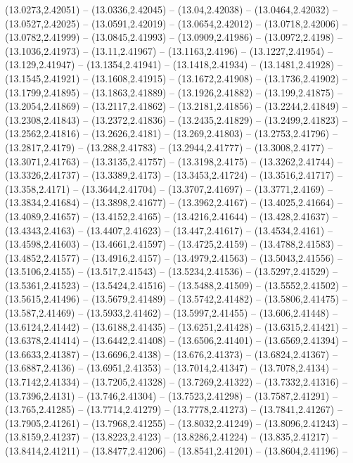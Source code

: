 {(13.0273,2.42051) -- (13.0336,2.42045) -- (13.04,2.42038) -- (13.0464,2.42032) -- (13.0527,2.42025) -- (13.0591,2.42019) -- (13.0654,2.42012) -- (13.0718,2.42006) -- (13.0782,2.41999) -- (13.0845,2.41993) -- (13.0909,2.41986) -- (13.0972,2.4198) --
(13.1036,2.41973) -- (13.11,2.41967) -- (13.1163,2.4196) -- (13.1227,2.41954) -- (13.129,2.41947) -- (13.1354,2.41941) -- (13.1418,2.41934) -- (13.1481,2.41928) -- (13.1545,2.41921) -- (13.1608,2.41915) -- (13.1672,2.41908) -- (13.1736,2.41902) --
(13.1799,2.41895) -- (13.1863,2.41889) -- (13.1926,2.41882) -- (13.199,2.41875) -- (13.2054,2.41869) -- (13.2117,2.41862) -- (13.2181,2.41856) -- (13.2244,2.41849) -- (13.2308,2.41843) -- (13.2372,2.41836) -- (13.2435,2.41829) -- (13.2499,2.41823)
-- (13.2562,2.41816) -- (13.2626,2.4181) -- (13.269,2.41803) -- (13.2753,2.41796) -- (13.2817,2.4179) -- (13.288,2.41783) -- (13.2944,2.41777) -- (13.3008,2.4177) -- (13.3071,2.41763) -- (13.3135,2.41757) -- (13.3198,2.4175) -- (13.3262,2.41744) --
(13.3326,2.41737) -- (13.3389,2.4173) -- (13.3453,2.41724) -- (13.3516,2.41717) -- (13.358,2.4171) -- (13.3644,2.41704) -- (13.3707,2.41697) -- (13.3771,2.4169) -- (13.3834,2.41684) -- (13.3898,2.41677) -- (13.3962,2.4167) -- (13.4025,2.41664) --
(13.4089,2.41657) -- (13.4152,2.4165) -- (13.4216,2.41644) -- (13.428,2.41637) -- (13.4343,2.4163) -- (13.4407,2.41623) -- (13.447,2.41617) -- (13.4534,2.4161) -- (13.4598,2.41603) -- (13.4661,2.41597) -- (13.4725,2.4159) -- (13.4788,2.41583) --
(13.4852,2.41577) -- (13.4916,2.4157) -- (13.4979,2.41563) -- (13.5043,2.41556) -- (13.5106,2.4155) -- (13.517,2.41543) -- (13.5234,2.41536) -- (13.5297,2.41529) -- (13.5361,2.41523) -- (13.5424,2.41516) -- (13.5488,2.41509) -- (13.5552,2.41502) --
(13.5615,2.41496) -- (13.5679,2.41489) -- (13.5742,2.41482) -- (13.5806,2.41475) -- (13.587,2.41469) -- (13.5933,2.41462) -- (13.5997,2.41455) -- (13.606,2.41448) -- (13.6124,2.41442) -- (13.6188,2.41435) -- (13.6251,2.41428) -- (13.6315,2.41421) --
(13.6378,2.41414) -- (13.6442,2.41408) -- (13.6506,2.41401) -- (13.6569,2.41394) -- (13.6633,2.41387) -- (13.6696,2.4138) -- (13.676,2.41373) -- (13.6824,2.41367) -- (13.6887,2.4136) -- (13.6951,2.41353) -- (13.7014,2.41347) -- (13.7078,2.4134) --
(13.7142,2.41334) -- (13.7205,2.41328) -- (13.7269,2.41322) -- (13.7332,2.41316) -- (13.7396,2.4131) -- (13.746,2.41304) -- (13.7523,2.41298) -- (13.7587,2.41291) -- (13.765,2.41285) -- (13.7714,2.41279) -- (13.7778,2.41273) -- (13.7841,2.41267) --
(13.7905,2.41261) -- (13.7968,2.41255) -- (13.8032,2.41249) -- (13.8096,2.41243) -- (13.8159,2.41237) -- (13.8223,2.4123) -- (13.8286,2.41224) -- (13.835,2.41217) -- (13.8414,2.41211) -- (13.8477,2.41206) -- (13.8541,2.41201) -- (13.8604,2.41196) --
}
